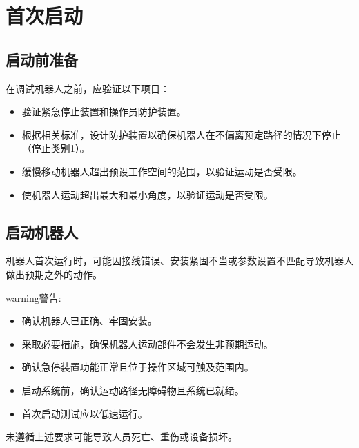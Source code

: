 \documentclass[a4paper,11pt,english,openany,oneside]{sphinxmanual}
\begin{document}
\section{首次启动}
\label{\detokenize{08 _u5b89_u88c5_u4e0e_u8c03_u8bd5:id79}}\label{\detokenize{08 _u5b89_u88c5_u4e0e_u8c03_u8bd5:id80}}

\subsection{启动前准备}
\label{\detokenize{08 _u5b89_u88c5_u4e0e_u8c03_u8bd5:id81}}\label{\detokenize{08 _u5b89_u88c5_u4e0e_u8c03_u8bd5:id82}}
\sphinxAtStartPar
在调试机器人之前，应验证以下项目：
\begin{itemize}
\item {} 
\sphinxAtStartPar
验证紧急停止装置和操作员防护装置。

\item {} 
\sphinxAtStartPar
根据相关标准，设计防护装置以确保机器人在不偏离预定路径的情况下停止（停止类别1）。

\item {} 
\sphinxAtStartPar
缓慢移动机器人超出预设工作空间的范围，以验证运动是否受限。

\item {} 
\sphinxAtStartPar
使机器人运动超出最大和最小角度，以验证运动是否受限。

\end{itemize}


\subsection{启动机器人}
\label{\detokenize{08 _u5b89_u88c5_u4e0e_u8c03_u8bd5:id83}}\label{\detokenize{08 _u5b89_u88c5_u4e0e_u8c03_u8bd5:id84}}
\sphinxAtStartPar
机器人首次运行时，可能因接线错误、安装紧固不当或参数设置不匹配导致机器人做出预期之外的动作。

\begin{sphinxadmonition}{warning}{警告:}
\sphinxAtStartPar
{}
\begin{itemize}
\item {} 
\sphinxAtStartPar
确认机器人已正确、牢固安装。

\item {} 
\sphinxAtStartPar
采取必要措施，确保机器人运动部件不会发生非预期运动。

\item {} 
\sphinxAtStartPar
确认急停装置功能正常且位于操作区域可触及范围内。

\item {} 
\sphinxAtStartPar
启动系统前，确认运动路径无障碍物且系统已就绪。

\item {} 
\sphinxAtStartPar
首次启动测试应以低速运行。

\end{itemize}

\sphinxAtStartPar
未遵循上述要求可能导致人员死亡、重伤或设备损坏。
\end{sphinxadmonition}
\end{document}
